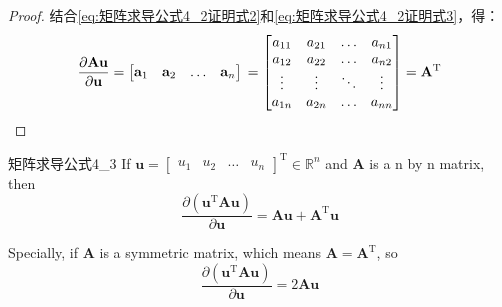 \documentclass[withoutpreface,bwprint]{NoteBook}
\begin{document}
\begin{proof}
结合\cref{eq:矩阵求导公式4_2证明式2}和\cref{eq:矩阵求导公式4_2证明式3}，得：
\begin{equation}
    \label{eq:矩阵求导公式4_2证明式4}
    \frac{\partial \mathbf{A}\mathbf{u}}{\partial \mathbf{u}} 
    =
    \begin{bmatrix} 
    \mathbf{a}_1 & \mathbf{a}_2 & \dots & \mathbf{a}_n
    \end{bmatrix} \\
    =
    \begin{bmatrix} 
    a_{11} & a_{21} & \dots & a_{n1} \\
    a_{12} & a_{22} & \dots & a_{n2} \\
    \vdots & \vdots & \ddots & \vdots \\
    a_{1n} & a_{2n} & \dots & a_{nn} \\
    \end{bmatrix}
    =
    \mathbf{A}^\mathrm{T}
\end{equation}
    
\end{proof}

\begin{matrixDerivativeEquation}
    {}
    {矩阵求导公式4_3}
    If
    $\mathbf{u}=
    \begin{bmatrix}
        u_1 & u_2 & \dots & u_n     
    \end{bmatrix}^\mathrm{T} \in \mathbb{R}^n$ and
    $\mathbf{A}$ is a n by n matrix, then
    $$
    \frac{\partial ( \mathbf{u}^\mathrm{T} \mathbf{A} \mathbf{u} )}{\partial \mathbf{u}}
    =
    \mathbf{A} \mathbf{u} + \mathbf{A}^\mathrm{T} \mathbf{u} 
    $$
    
    Specially, if $\mathbf{A}$ is a symmetric matrix, 
    which means $\mathbf{A} = \mathbf{A}^\mathrm{T}$, 
    so
    $$
    \frac{\partial ( \mathbf{u}^\mathrm{T} \mathbf{A} \mathbf{u} )}{\partial \mathbf{u}}
    =
    2 \mathbf{A} \mathbf{u}
    $$
\end{matrixDerivativeEquation}
\end{document}
